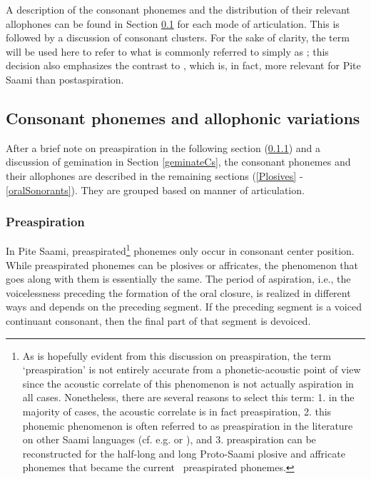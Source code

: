 A description of the consonant phonemes and the distribution of their relevant allophones can be found in Section \ref{Callophones} for each mode of articulation. 
This is followed by a discussion of consonant clusters. 
For the sake of clarity, the term  will be used here to refer to what is commonly referred to simply as ; this decision also emphasizes the contrast to , which is, in fact, more relevant for Pite Saami than postaspiration.


\subsection{Consonant phonemes and allophonic variations}\label{Callophones}
After a brief note on preaspiration in the following section (\ref{preaspiration}) and a discussion of gemination in Section \ref{geminateCs}, the consonant phonemes and their allophones are described in the remaining sections (\ref{Plosives} - \ref{oralSonorants}). They are grouped based on manner of articulation.


\subsubsection{Preaspiration}\label{preaspiration}\noindent
In Pite Saami, preaspirated\footnote{As is hopefully evident from this discussion on preaspiration, the term ‘preaspiration’ is not entirely accurate from a phonetic-acoustic point of view since the acoustic correlate of this phenomenon is not actually aspiration in all cases. Nonetheless, there are several reasons to select this term: 1. in the majority of cases, the acoustic correlate is in fact preaspiration, 2. this phonemic phenomenon is often referred to as preaspiration in the literature on %
other Saami languages (cf. e.g. \citealt[54-55]{Sammallahti1998} %
or \citealt[57,67]{Feist2010}), and 3. preaspiration can be reconstructed for the half-long and long Proto-Saami plosive and affricate phonemes \citep[cf.][54]{Sammallahti1998} that became the current \PS\ preaspirated phonemes.} 
phonemes only occur in consonant center position. While preaspirated phonemes can be plosives or affricates, the phenomenon that goes along with them is essentially the same. %
The period of aspiration, i.e., the voicelessness preceding the formation of the oral closure, is realized in different ways and depends on the preceding segment. If the preceding segment is a voiced continuant %
consonant, then the final part of that segment is devoiced. 

